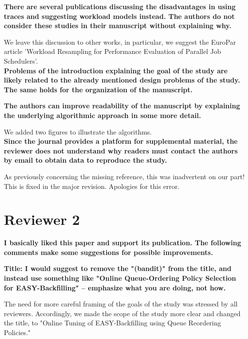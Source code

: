 \documentclass[]{article}
\begin{document}
\textbf{There are several publications discussing the disadvantages in using
traces and suggesting workload models instead. The authors do not consider
these studies in their manuscript without explaining why.}

We leave this discussion to other works, in particular, we suggest the EuroPar
article 'Workload Resampling for Performance Evaluation of Parallel Job
Schedulers'.\\

\textbf{Problems of the introduction explaining the goal of the study are
likely related to the already mentioned design problems of the study. The same
holds for the organization of the manuscript.}

\textbf{The authors can improve readability of the manuscript by explaining the
underlying algorithmic approach in some more detail.}

We added two figures to illustrate the algorithms.\\

\textbf{Since the journal provides a platform for supplemental material, the
reviewer does not understand why readers must contact the authors by email to
obtain data to reproduce the study.  }

As previously concerning the missing reference, this was inadvertent on our
part! This is fixed in the major revision. Apologies for this error.

\section{Reviewer 2}

\textbf{I basically liked this paper and support its publication.  The
following comments make some suggestions for possible improvements.}

\textbf{Title: I would suggest to remove the "(bandit)" from the title, and
instead use something like "Online Queue-Ordering Policy Selection for
EASY-Backfilling" -- emphasize what you are doing, not how.}

The need for more careful framing of the goals of the study was stressed by all
reviewers. Accordingly, we made the scope of the study more clear and changed
the title, to "Online Tuning of EASY-Backfilling using Queue Reordering
Policies."\\
\end{document}
